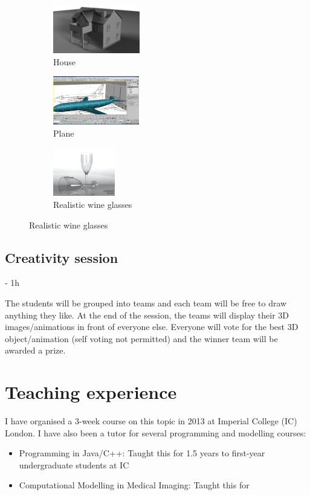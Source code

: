 \documentclass[11pt,a4paper]{report}
\begin{document}
\begin{figure}
 \begin{subfigure}{0.3\textwidth}
 \centering
  \includegraphics[height=80px]{images/house.jpg}
  \caption{House}
 \end{subfigure}
 \begin{subfigure}{0.3\textwidth}
 \centering
  \includegraphics[height=80px, trim=0 0 200 0, clip]{images/plane.jpg}
  \caption{Plane}
 \end{subfigure}
 \begin{subfigure}{0.3\textwidth}
 \centering
  \includegraphics[height=80px]{images/glass03.jpg}
  \caption{Realistic wine glasses}
 \end{subfigure}
\end{figure}



\subsection*{Creativity session} - 1h

The students will be grouped into teams and each team will be free to draw anything they like. At the end of the session, the teams will display their 3D images/animations in front of everyone else. Everyone will vote for the best 3D object/animation (self voting not permitted) and the winner team will be awarded a prize.


\section*{Teaching experience}

I have organised a 3-week course on this topic in 2013 at Imperial College (IC) London. I have also been a tutor for several programming and modelling courses:
\begin{itemize}
 \item Programming in Java/C++: Taught this for 1.5 years to first-year undergraduate students at IC
 \item Computational Modelling in Medical Imaging: Taught this for 
\end{itemize}
\end{document}
